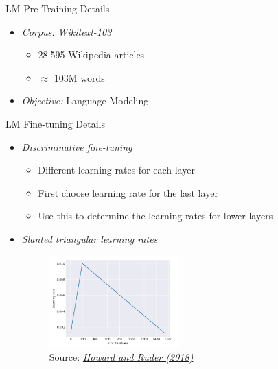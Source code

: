 
\begin{vbframe}{LM Pre-Training Details}

\vfill

\begin{itemize}
	\item \textit{Corpus: Wikitext-103}
		\begin{itemize}
			\item 28.595 Wikipedia articles
			\item $\approx$ 103M words
		\end{itemize}
	\item \textit{Objective:} Language Modeling
\end{itemize}

\vfill

\end{vbframe}


\begin{vbframe}{LM Fine-tuning Details}

\vfill

\begin{itemize}
	\item \textit{Discriminative fine-tuning}
		\begin{itemize}
			\item Different learning rates for each layer
			\item First choose learning rate for the last layer
			\item Use this to determine the learning rates for lower layers
		\end{itemize}
	\item \textit{Slanted triangular learning rates}
		\begin{figure}
		\centering
		\includegraphics[width = 5cm]{figure/slanted.png}\\ 
		\footnotesize{Source:} \href{https://arxiv.org/pdf/1801.06146.pdf}{\footnotesize \it Howard and Ruder (2018)}
	\end{figure}

\end{itemize}

\vfill

\end{vbframe}

